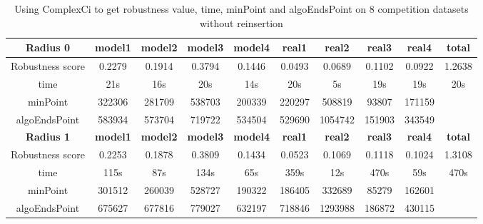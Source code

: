 \documentclass{article}
\begin{document}
	\begin{table}[!htbp]
	\begin{adjustwidth}{-1cm}{}		
		\begin{threeparttable}		
			\centering
			\caption{Using ComplexCi to get robustness value, time, minPoint and algoEndsPoint  on 8 competition datasets without reinsertion}
			\label{tab:table8}
			\begin{tabular}{|c|c|c|c|c|c|c|c|c|c|}
				\hline
				\textbf{Radius 0} & \textbf{model1} & \textbf{model2} & \textbf{model3} & \textbf{model4} & \textbf{real1} & \textbf{real2} & \textbf{real3} & \textbf{real4} & \textbf{total} \\ \hline
				Robustness score                 & 0.2279          & 0.1914          & 0.3794          & 0.1446          & 0.0493         & 0.0689         & 0.1102         & 0.0922         & 1.2638         \\ \hline
				time                             & 21s             & 16s             & 20s             & 14s             & 20s            & 5s             & 19s            & 19s            & 20s            \\ \hline
				minPoint                & 322306          & 281709          & 538703          & 200339          & 220297         & 508819         & 93807          & 171159         &                \\ \hline
				algoEndsPoint           & 583934          & 573704          & 719722          & 534504          & 529690         & 1054742        & 151903         & 343549         &                \\ \hline
				
				\textbf{Radius 1} & \textbf{model1} & \textbf{model2} & \textbf{model3} & \textbf{model4} & \textbf{real1} & \textbf{real2} & \textbf{real3} & \textbf{real4} & \textbf{total} \\ \hline
				Robustness score                 & 0.2253          & 0.1878          & 0.3809          & 0.1434          & 0.0523         & 0.1069         & 0.1118         & 0.1024         & 1.3108         \\ \hline
				time                             & 115s            & 87s             & 134s            & 65s             & 359s           & 12s            & 470s           & 59s            & 470s           \\ \hline
				minPoint                         & 301512          & 260039          & 528727          & 190322          & 186405         & 332689         & 85279          & 162601         &                \\ \hline
				algoEndsPoint                    & 675627          & 677816          & 779027          & 632197          & 718846         & 1293988        & 186872         & 430115         &                \\ \hline		
				

\end{tabular}
\end{threeparttable}
\end{adjustwidth}
\end{table}
\end{document}
